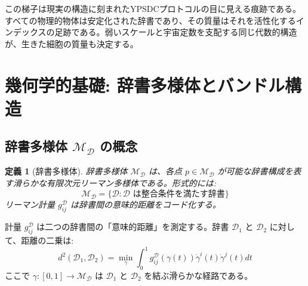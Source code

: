 \documentclass[11pt,a4paper]{article}
\newtheorem{definition}{定義}
\begin{document}
	この梯子は現実の構造に刻まれたYPSDCプロトコルの目に見える痕跡である。すべての物理的物体は安定化された辞書であり、その質量はそれを活性化するインデックスの足跡である。弱いスケールと宇宙定数を支配する同じ代数的構造が、生きた細胞の質量も決定する。
	
	\section{幾何学的基礎: 辞書多様体とバンドル構造}
	\subsection{辞書多様体 $\mathcal{M}_{\mathcal{D}}$ の概念}
	
	\begin{definition}[辞書多様体]
		辞書多様体 $\mathcal{M}_{\mathcal{D}}$ は、各点 $p \in \mathcal{M}_{\mathcal{D}}$ が可能な辞書構成を表す滑らかな有限次元リーマン多様体である。形式的には:
		\begin{equation}
			\mathcal{M}_{\mathcal{D}} = \{ \mathcal{D} : \mathcal{D} \text{ は整合条件を満たす辞書} \}
		\end{equation}
		リーマン計量 $g_{ij}^{\mathcal{D}}$ は辞書間の意味的距離をコード化する。
	\end{definition}
	
	計量 $g_{ij}^{\mathcal{D}}$ は二つの辞書間の「意味的距離」を測定する。辞書 $\mathcal{D}_1$ と $\mathcal{D}_2$ に対して、距離の二乗は:
	\begin{equation}
		d^2(\mathcal{D}_1, \mathcal{D}_2) = \min_{\gamma} \int_0^1 g_{ij}^{\mathcal{D}}(\gamma(t)) \dot{\gamma}^i(t) \dot{\gamma}^j(t) dt
	\end{equation}
	ここで $\gamma: [0,1] \to \mathcal{M}_{\mathcal{D}}$ は $\mathcal{D}_1$ と $\mathcal{D}_2$ を結ぶ滑らかな経路である。
	
\end{document}
